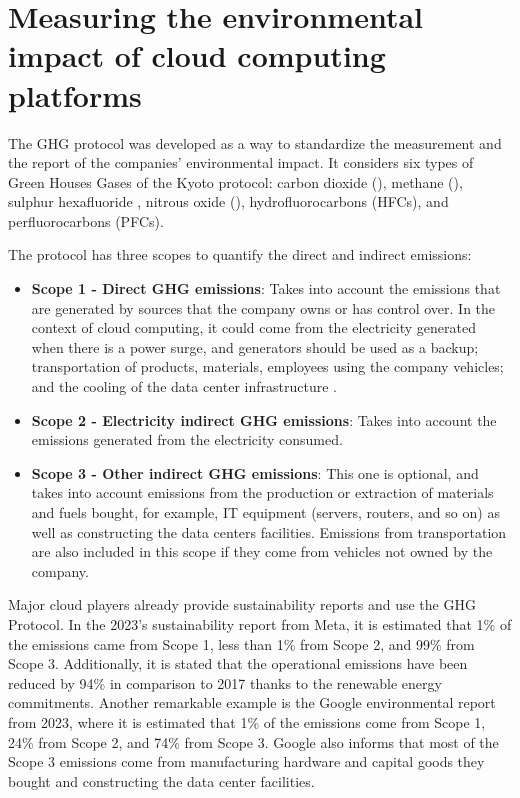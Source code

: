 \section{Measuring the environmental impact of cloud computing platforms}

\label{sec:measuring_environmental_impact}

The GHG protocol \cite{ghgprotocol2004} was developed as a way to standardize the measurement and the report of the companies' environmental impact. It considers six types of Green Houses Gases of the Kyoto protocol: carbon dioxide (), methane (), sulphur hexafluoride , nitrous oxide (), hydrofluorocarbons (HFCs), and perfluorocarbons (PFCs).

The protocol has three scopes to quantify the direct and indirect emissions:

\begin{itemize}
\item \textbf{Scope 1 - Direct GHG emissions}: Takes into account the emissions that are generated by sources that the company owns or has control over. In the context of cloud computing, it could come from the electricity generated when there is a power surge, and generators should be used as a backup; transportation of products, materials, employees using the company vehicles; and the cooling of the data center infrastructure \cite{gupta2021_chasingcarbon}.
\item \textbf{Scope 2 - Electricity indirect GHG emissions}: Takes into account the emissions generated from the electricity consumed.
\item \textbf{Scope 3 - Other indirect GHG emissions}: This one is optional, and takes into account emissions from the production or extraction of materials and fuels bought, for example, IT equipment (servers, routers, and so on) as well as constructing the data centers facilities. Emissions from transportation are also included in this scope if they come from vehicles not owned by the company. 
\end{itemize}  

Major cloud players already provide sustainability reports and use the GHG Protocol. In the 2023's sustainability report from Meta\cite{meta_sustainability_report_2023}, it is estimated that 1\% of the emissions came from Scope 1, less than 1\% from Scope 2, and 99\% from Scope 3. Additionally, it is stated that the operational emissions have been reduced by 94\% in comparison to 2017 thanks to the renewable energy commitments. Another remarkable example is the Google environmental report from 2023\cite{google_sustainability_report_2023}, where it is estimated that 1\% of the emissions come from Scope 1, 24\% from Scope 2, and 74\% from Scope 3. Google also informs that most of the Scope 3 emissions come from manufacturing hardware and capital goods they bought and constructing the data center facilities.

